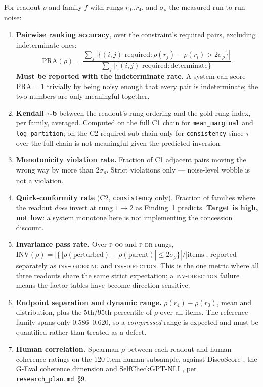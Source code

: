 \documentclass[11pt]{article}
\newcommand{\readout}[1]{\texttt{#1}}
\begin{document}
For readout $\rho$ and family $f$ with rungs $r_0..r_4$, and $\sigma_\rho$ the measured
run-to-run noise:

\begin{enumerate}[leftmargin=*,nosep,label=\textbf{B\arabic*.}]
  \item \textbf{Pairwise ranking accuracy}, over the constraint's required pairs, excluding
        indeterminate ones:
        \[
          \mathrm{PRA}(\rho) =
          \frac{\sum_f |\{(i,j) \text{ required} : \rho(r_j) - \rho(r_i) > 2\sigma_\rho\}|}
               {\sum_f |\{(i,j) \text{ required} : \text{determinate}\}|}.
        \]
        \textbf{Must be reported with the indeterminate rate.} A system can score
        $\mathrm{PRA}=1$ trivially by being noisy enough that every pair is indeterminate; the
        two numbers are only meaningful together.
  \item \textbf{Kendall $\tau$-b} between the readout's rung ordering and the gold rung index,
        per family, averaged. Computed on the full C1 chain for \readout{mean\_marginal} and
        \readout{log\_partition}; on the C2-required sub-chain only for \readout{consistency}
        since $\tau$ over the full chain is not meaningful given the
        predicted inversion.
  \item \textbf{Monotonicity violation rate.} Fraction of C1 adjacent pairs moving the wrong
        way by more than $2\sigma_\rho$. Strict violations only --- noise-level wobble is not a
        violation.
  \item \textbf{Quirk-conformity rate} (C2, \readout{consistency} only).
        Fraction of families where the readout \emph{does} invert at rung $1\to2$ as
        Finding~1 predicts. \textbf{Target is high, not low}: a system monotone here is not
        implementing the concession discount.
  \item \textbf{Invariance pass rate.} Over \textsc{p-oo} and \textsc{p-dr} rungs,
        $\mathrm{INV}(\rho) = |\{\,|\rho(\text{perturbed}) - \rho(\text{parent})| \leq
        2\sigma_\rho\}| / |\text{items}|$, reported separately as \textsc{inv-ordering} and
        \textsc{inv-direction}. This is the one metric where all three readouts share the same
        strict expectation; a \textsc{inv-direction} failure means the factor tables have become
        direction-sensitive.
  \item \textbf{Endpoint separation and dynamic range.} $\rho(r_4) - \rho(r_0)$, mean and
        distribution, plus the 5th/95th percentile of $\rho$ over all items. The reference
        family spans only $0.586$--$0.620$, so a \emph{compressed} range is expected and must be
        quantified rather than treated as a defect.
  \item \textbf{Human correlation.} Spearman $\rho$ between each readout and human coherence
        ratings on the 120-item human subsample, against DiscoScore \citep{discoscore}, the
        G-Eval coherence dimension \citep{geval} and SelfCheckGPT-NLI \citep{selfcheckgpt}, per
        \texttt{research\_plan.md}~\S9.
\end{enumerate}
\end{document}
